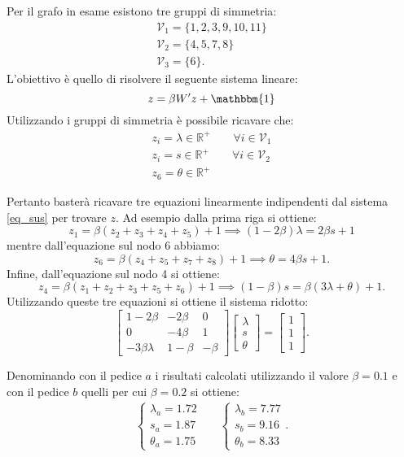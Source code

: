 \begin{alphaparts}
\questionpart %
Per il grafo in esame esistono tre gruppi di simmetria:
\begin{gather*}
    \mathcal{V}_1 = \{ 1,2,3,9,10,11\} \\
    \mathcal{V}_2 = \{ 4,5,7,8\}\\
    \mathcal{V}_3 = \{6\}.
\end{gather*}
L'obiettivo è quello di risolvere il seguente sistema lineare:
\begin{equation} \label{eq_sus}
    z = \beta W' z + \mathbbm{1}
\end{equation}
Utilizzando i gruppi di simmetria è possibile ricavare che:
\begin{gather*}
    z_i = \lambda \in \mathbb{R}^+ \quad \quad \forall i \in \mathcal{V}_1\\
    z_i = s \in \mathbb{R}^+ \quad \quad \forall i \in \mathcal{V}_2\\
    z_6 = \theta \in \mathbb{R}^+ 
\end{gather*}

Pertanto basterà ricavare tre equazioni linearmente indipendenti dal sistema \eqref{eq_sus} per trovare \(z\). Ad esempio dalla prima riga si ottiene:
\[z_1 = \beta(z_2+ z_3+ z_4+ z_5)+ 1 \implies (1- 2\beta)\lambda = 2\beta s + 1\]
mentre dall'equazione sul nodo 6 abbiamo:
\[z_6 = \beta(z_4 + z_5 + z_7 + z_8) + 1 \implies \theta = 4\beta s + 1.\]
Infine, dall'equazione sul nodo 4 si ottiene:
\[z_4 = \beta (z_1 + z_2 + z_3 + z_5 + z_6) + 1 \implies (1- \beta) s = \beta (3 \lambda + \theta) + 1.\]
Utilizzando queste tre equazioni si ottiene il sistema ridotto:
\[
\begin{bmatrix}
     1- 2\beta & - 2\beta & 0 \\
     0 & - 4\beta & 1 \\
    - 3\beta\lambda & 1- \beta & - \beta
\end{bmatrix}
\begin{bmatrix} \lambda \\ s \\ \theta \end{bmatrix} =
\begin{bmatrix} 1 \\ 1 \\ 1 \end{bmatrix}.     
\]

Denominando con il pedice \(a\) i risultati calcolati utilizzando il valore \(\beta = 0.1\) e con il pedice \(b\) quelli per cui \(\beta = 0.2\) si ottiene:
\begin{align*}
    \begin{cases}
      \lambda_a = 1.72 \\
      s_a = 1.87 \\
      \theta_a = 1.75
    \end{cases} && \begin{cases}
      \lambda_b = 7.77 \\
      s_b = 9.16 \\
      \theta_b = 8.33
    \end{cases}.
  \end{align*}


\end{alphaparts}
